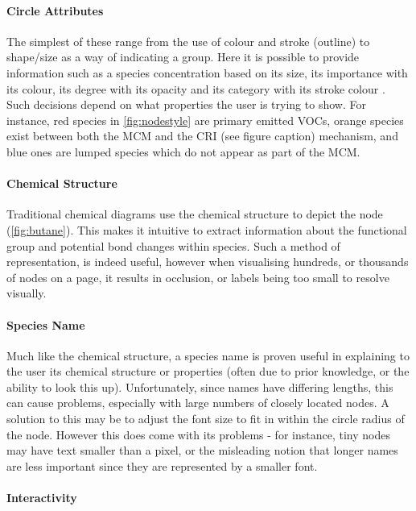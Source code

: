 \paragraph*{\color{c4}Circle Attributes}

The simplest of these range from the use of colour and stroke (outline) to  shape/size as a way of indicating a group. Here it is possible to provide information such as a species concentration based on its size, its importance with its colour, its degree with its opacity and its category with its stroke colour \citep{colourb,rightness}. Such decisions depend on what properties the user is trying to show. For instance, red species in \autoref{fig:nodestyle} are primary emitted VOCs, orange species exist between both the MCM and the CRI (see figure caption) mechanism, and blue ones are lumped species which do not appear as part of the MCM.  


\paragraph*{\color{c1}Chemical Structure}
Traditional chemical diagrams use the chemical structure to depict the node (\autoref{fig:butane}). This makes it intuitive to extract information about the functional group and potential bond changes within species. Such a method of representation, is indeed useful, however when visualising hundreds, or thousands of nodes on a page, it results in occlusion, or labels being too small to resolve visually. 

\paragraph*{\color{c2}Species Name}

Much like the chemical structure, a species name is proven useful in explaining to the user its chemical structure or properties (often due to prior knowledge, or the ability to look this up). Unfortunately, since names have differing lengths, this can cause problems, especially with large numbers of closely located nodes. A solution to this may be to adjust the font size to fit in within the circle radius of the node. However this does come with its problems - for instance, tiny nodes may have text smaller than a pixel, or the misleading notion that longer names are less important since they are represented by a smaller font. 


\paragraph*{\color{c3}Interactivity}

